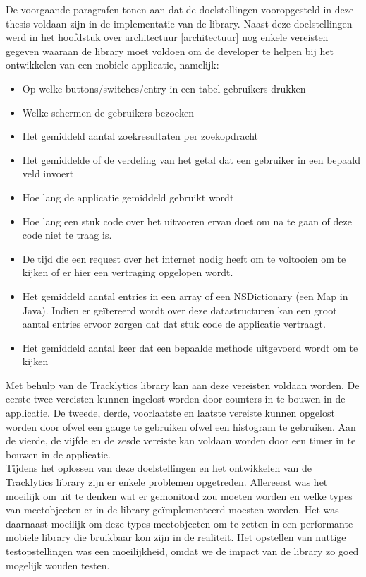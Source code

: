 De voorgaande paragrafen tonen aan dat de doelstellingen vooropgesteld in deze thesis voldaan zijn in de implementatie van de library. Naast deze doelstellingen werd in het hoofdstuk over architectuur \ref{architectuur} nog enkele vereisten gegeven waaraan de library moet voldoen om de developer te helpen bij het ontwikkelen van een mobiele applicatie, namelijk: 
\begin{itemize}
\item Op welke buttons/switches/entry in een tabel gebruikers drukken
\item Welke schermen de gebruikers bezoeken
\item Het gemiddeld aantal zoekresultaten per zoekopdracht
\item Het gemiddelde of de verdeling van het getal dat een gebruiker in een bepaald veld invoert
\item Hoe lang de applicatie gemiddeld gebruikt wordt
\item Hoe lang een stuk code over het uitvoeren ervan doet om na te gaan of deze code niet te traag is.
\item De tijd die een request over het internet nodig heeft om te voltooien om te kijken of er hier een vertraging opgelopen wordt.
\item Het gemiddeld aantal entries in een array of een NSDictionary (een Map in Java). Indien er ge\"itereerd wordt over deze datastructuren kan een groot aantal entries ervoor zorgen dat dat stuk code de applicatie vertraagt.
\item Het gemiddeld aantal keer dat een bepaalde methode uitgevoerd wordt om te kijken
\end{itemize}

Met behulp van de Tracklytics library kan aan deze vereisten voldaan worden. De eerste twee vereisten kunnen ingelost worden door counters in te bouwen in de applicatie. De tweede, derde, voorlaatste en laatste vereiste kunnen opgelost worden door ofwel een gauge te gebruiken ofwel een histogram te gebruiken. Aan de vierde, de vijfde en de zesde vereiste kan voldaan worden door een timer in te bouwen in de applicatie.\\

Tijdens het oplossen van deze doelstellingen en het ontwikkelen van de Tracklytics library zijn er enkele problemen opgetreden. Allereerst was het moeilijk om uit te denken wat er gemonitord zou moeten worden en welke types van meetobjecten er in de library ge\"implementeerd moesten worden. Het was daarnaast moeilijk om deze types meetobjecten om te zetten in een performante mobiele library die bruikbaar kon zijn in de realiteit. Het opstellen van nuttige testopstellingen was een moeilijkheid, omdat we de impact van de library zo goed mogelijk wouden testen.\\

